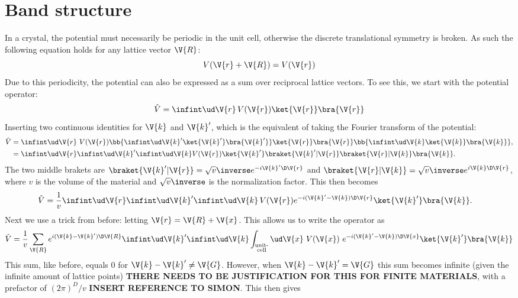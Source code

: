 \documentclass[main.tex]{subfiles}
\begin{document}
	
	\section{Band structure}
	In a crystal, the potential must necessarily be periodic in the unit cell, otherwise the discrete translational symmetry is broken. As such the following equation holds for any lattice vector $ \V{R} $:
	\begin{equation}\label{eq:band_period_V}
		V(\V{r}+\V{R}) = V(\V{r})
	\end{equation}
	Due to this periodicity, the potential can also be expressed as a sum over reciprocal lattice vectors. To see this, we start with the potential operator:
	\begin{equation}
		\hat{V} = \infint \ud \V{r} \, V(\V{r}) \ket{\V{r}}\bra{\V{r}}
	\end{equation}
	Inserting two continuous identities for $ \V{k} $ and $ \V{k}' $, which is the equivalent of taking the Fourier transform of the potential: 
	\begin{align}
		\hat{V} &= \infint \ud \V{r}\ V(\V{r}) \bb{\infint \ud \V{k}' \ket{\V{k}'} \bra{\V{k}'}} \ket{\V{r}}\bra{\V{r}} \bb{\infint \ud \V{k} \ket{\V{k}} \bra{\V{k}}}, \\
		&= \infint \ud\V{r} \infint \ud \V{k}' \infint \ud \V{k} V(\V{r}) \ket{\V{k}'} \braket{\V{k}' | \V{r}} \braket{\V{r} | \V{k}} \bra{\V{k}}.
	\end{align}
	The two middle brakets are $ \braket{\V{k}'| \V{r}}= \sqrt{v}\inverse e^{-i \V{k}' \D \V{r}} $ and $ \braket{\V{r} | \V{k}} = \sqrt{v}\inverse e^{i \V{k} \D \V{r}} $,  where $ v $ is the volume of the material and $ \sqrt{v}\inverse $ is the normalization factor. This then becomes
	\begin{align}
		\hat{V} &= \frac{1}{v} \infint \ud\V{r} \infint \ud \V{k}' \infint \ud \V{k}\, V(\V{r}) e^{-i(\V{k}'-\V{k}) \D \V{r}} \ket{\V{k}'} \bra{\V{k}}.
	\end{align}
	Next we use a trick from before: letting $ \V{r} = \V{R} + \V{x} $. This allows us to write the operator as
	\begin{equation}
		\hat{V} = \frac{1}{v} \sum_{\V{R}} e^{i(\V{k}-\V{k}') \D \V{R}} \infint \ud \V{k}' \infint \ud \V{k} \int_{\substack{\text{unit-} \\\text{cell}}} \ud \V{x}\ V(\V{x})\  e^{-i (\V{k}'-\V{k}) \D \V{x}} \ket{\V{k}'} \bra{\V{k}}
	\end{equation}
	This sum, like before, equals 0 for $ \V{k}-\V{k}' \neq \V{G} $. However, when $ \V{k}-\V{k}' = \V{G} $ this sum becomes infinite (given the infinite amount of lattice points) \textbf{THERE NEEDS TO BE JUSTIFICATION FOR THIS FOR FINITE MATERIALS}, with a prefactor of $ (2\pi)^D/v $ \textbf{INSERT REFERENCE TO SIMON}. This then gives
\end{document}
